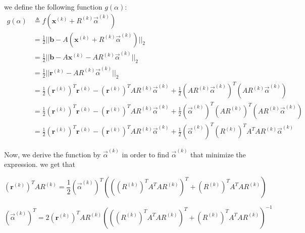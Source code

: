 \documentclass{article}
\begin{document}
\begin{enumerate}[(a)]
we define the following function $g(\alpha)$:
\begin{align*}
g(\alpha) &\triangleq  f(\mathbf{x}^{(k)} + R^{(k)}\vec{\alpha}^{(k)})\\
&= \frac{1}{2}||\mathbf{b}-A(\mathbf{x}^{(k)} + R^{(k)}\vec{\alpha}^{(k)})||_2\\
&= \frac{1}{2}||\mathbf{b}-A\mathbf{x}^{(k)}-AR^{(k)}\vec{\alpha}^{(k)}||_2\\
&= \frac{1}{2}||\mathbf{r}^{(k)}-AR^{(k)}\vec{\alpha}^{(k)}||_2\\
&= \frac{1}{2}(\mathbf{r}^{(k)})^T\mathbf{r}^{(k)}-(\mathbf{r}^{(k)})^TAR^{(k)}\vec{\alpha}^{(k)}+\frac{1}{2}(AR^{(k)}\vec{\alpha}^{(k)})^T(AR^{(k)}\vec{\alpha}^{(k)})\\
&= \frac{1}{2}(\mathbf{r}^{(k)})^T\mathbf{r}^{(k)}-(\mathbf{r}^{(k)})^TAR^{(k)}\vec{\alpha}^{(k)}+\frac{1}{2}(\vec{\alpha}^{(k)})^{T}(AR^{(k)})^T(AR^{(k)}\vec{\alpha}^{(k)})\\
&= \frac{1}{2}(\mathbf{r}^{(k)})^T\mathbf{r}^{(k)}-(\mathbf{r}^{(k)})^TAR^{(k)}\vec{\alpha}^{(k)}+\frac{1}{2}(\vec{\alpha}^{(k)})^{T}(R^{(k)})^{T}A^{T}AR^{(k)}\vec{\alpha}^{(k)}
\end{align*}

Now, we derive the function by $\vec{\alpha}^{(k)}$ in order to find $\vec{\alpha}^{(k)}$ that minimize the expression. we get that

\[
(\mathbf{r}^{(k)})^TAR^{(k)} = \frac{1}{2}(\vec{\alpha}^{(k)})^{T}( ((R^{(k)})^{T}A^{T}AR^{(k)})^{T}+(R^{(k)})^{T}A^{T}AR^{(k)} )
\]

\[
(\vec{\alpha}^{(k)})^{T} = 2(\mathbf{r}^{(k)})^TAR^{(k)}( ((R^{(k)})^{T}A^{T}AR^{(k)})^{T}+(R^{(k)})^{T}A^{T}AR^{(k)} )^{-1}
\]

\end{enumerate}
\end{document}
